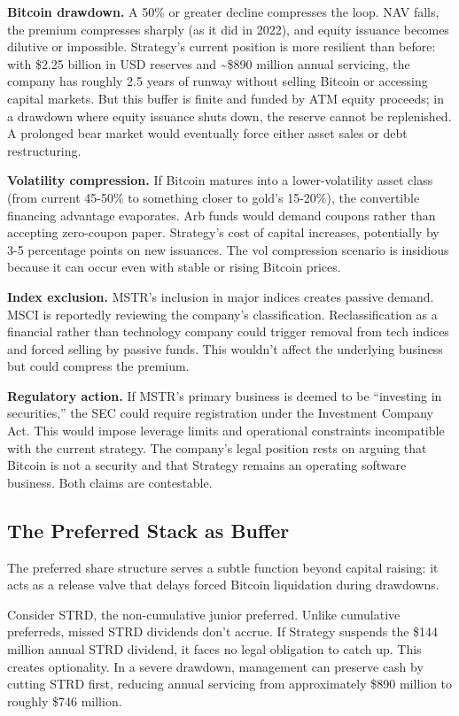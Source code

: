 \textbf{Bitcoin drawdown.} A 50\% or greater decline compresses the loop. NAV falls, the premium compresses sharply (as it did in 2022), and equity issuance becomes dilutive or impossible. Strategy's current position is more resilient than before: with \$2.25 billion in USD reserves and \textasciitilde\$890 million annual servicing, the company has roughly 2.5 years of runway without selling Bitcoin or accessing capital markets. But this buffer is finite and funded by ATM equity proceeds; in a drawdown where equity issuance shuts down, the reserve cannot be replenished. A prolonged bear market would eventually force either asset sales or debt restructuring.

\textbf{Volatility compression.} If Bitcoin matures into a lower-volatility asset class (from current 45-50\% to something closer to gold's 15-20\%), the convertible financing advantage evaporates. Arb funds would demand coupons rather than accepting zero-coupon paper. Strategy's cost of capital increases, potentially by 3-5 percentage points on new issuances. The vol compression scenario is insidious because it can occur even with stable or rising Bitcoin prices.

\textbf{Index exclusion.} MSTR's inclusion in major indices creates passive demand. MSCI is reportedly reviewing the company's classification. Reclassification as a financial rather than technology company could trigger removal from tech indices and forced selling by passive funds. This wouldn't affect the underlying business but could compress the premium.

\textbf{Regulatory action.} If MSTR's primary business is deemed to be ``investing in securities,'' the SEC could require registration under the Investment Company Act. This would impose leverage limits and operational constraints incompatible with the current strategy. The company's legal position rests on arguing that Bitcoin is not a security and that Strategy remains an operating software business. Both claims are contestable.

\subsection{The Preferred Stack as Buffer}

The preferred share structure serves a subtle function beyond capital raising: it acts as a release valve that delays forced Bitcoin liquidation during drawdowns.

Consider STRD, the non-cumulative junior preferred. Unlike cumulative preferreds, missed STRD dividends don't accrue. If Strategy suspends the \$144 million annual STRD dividend, it faces no legal obligation to catch up. This creates optionality. In a severe drawdown, management can preserve cash by cutting STRD first, reducing annual servicing from approximately \$890 million to roughly \$746 million.


